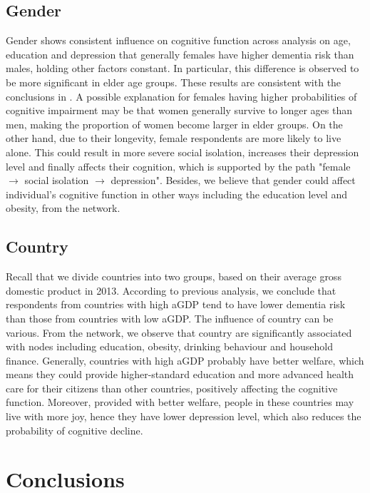 \documentclass[11pt,twoside]{article}
\numberwithin{Theorem}{section}
\numberwithin{Definition}{section}
\numberwithin{Lemma}{section}
\numberwithin{Algorithm}{section}
\numberwithin{equation}{section}
\begin{document}
\subsection{Gender}

Gender shows consistent influence on cognitive function across analysis on age, education and depression that generally females have higher dementia risk than males, holding other factors constant. In particular, this difference is observed to be more significant in elder age groups. These results are consistent with the conclusions in \cite{beam2018differences}.  A possible explanation for females having higher probabilities of cognitive impairment may be that women generally survive to longer ages than men, making the proportion of women become larger in elder groups. On the other hand, due to their longevity, female respondents are more likely to live alone. This could result in more severe social isolation, increases their depression level and finally affects their cognition, which is supported by the path "female $\rightarrow$ social isolation $\rightarrow$ depression". Besides, we believe that gender could affect individual's cognitive function in other ways including the education level and obesity, from the network.

\subsection{Country}

Recall that we divide countries into two groups, based on their average gross domestic product in 2013. According to previous analysis, we conclude that respondents from countries with high aGDP tend to have lower dementia risk than those from countries with low aGDP. The influence of country can be various. From the network, we observe that country are significantly associated with nodes including education, obesity, drinking behaviour and household finance. Generally, countries with high aGDP probably have better welfare, which means they could provide higher-standard education and more advanced health care for their citizens than other countries, positively affecting the cognitive function. Moreover, provided with better welfare, people in these countries may live with more joy, hence they have lower depression level, which also reduces the probability of cognitive decline.

\clearpage

\section{Conclusions}
\end{document}
